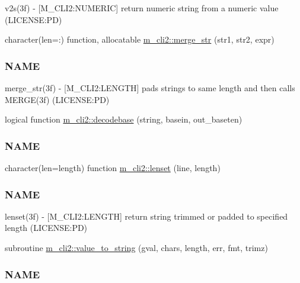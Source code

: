 \begin{DoxyCompactItemize}
\begin{DoxyCompactList}
v2s(3f) -\/ \mbox{[}M\+\_\+\+C\+L\+I2\+:N\+U\+M\+E\+R\+IC\mbox{]} return numeric string from a numeric value (L\+I\+C\+E\+N\+SE\+:PD) \end{DoxyCompactList}\item 
character(len=\+:) function, allocatable \mbox{\hyperlink{namespacem__cli2_a8e172feb2e4ae4d21d4fceb4e54f593c}{m\+\_\+cli2\+::merge\+\_\+str}} (str1, str2, expr)
\begin{DoxyCompactList}\small\item\em \subsubsection*{N\+A\+ME}

merge\+\_\+str(3f) -\/ \mbox{[}M\+\_\+\+C\+L\+I2\+:L\+E\+N\+G\+TH\mbox{]} pads strings to same length and then calls M\+E\+R\+G\+E(3f) (L\+I\+C\+E\+N\+SE\+:PD) \end{DoxyCompactList}\item 
logical function \mbox{\hyperlink{namespacem__cli2_a1029304d495b2bf791e03cfab5983bbb}{m\+\_\+cli2\+::decodebase}} (string, basein, out\+\_\+baseten)
\begin{DoxyCompactList}\small\item\em \subsubsection*{N\+A\+ME}\end{DoxyCompactList}\item 
character(len=length) function \mbox{\hyperlink{namespacem__cli2_ad13853611abfee00d40ffa020662ec8a}{m\+\_\+cli2\+::lenset}} (line, length)
\begin{DoxyCompactList}\small\item\em \subsubsection*{N\+A\+ME}

lenset(3f) -\/ \mbox{[}M\+\_\+\+C\+L\+I2\+:L\+E\+N\+G\+TH\mbox{]} return string trimmed or padded to specified length (L\+I\+C\+E\+N\+SE\+:PD) \end{DoxyCompactList}\item 
subroutine \mbox{\hyperlink{namespacem__cli2_a1bbcefd886dabb0286e2cb14ab54034f}{m\+\_\+cli2\+::value\+\_\+to\+\_\+string}} (gval, chars, length, err, fmt, trimz)
\begin{DoxyCompactList}\small\item\em \subsubsection*{N\+A\+ME}


\end{DoxyCompactList}
\end{DoxyCompactItemize}
